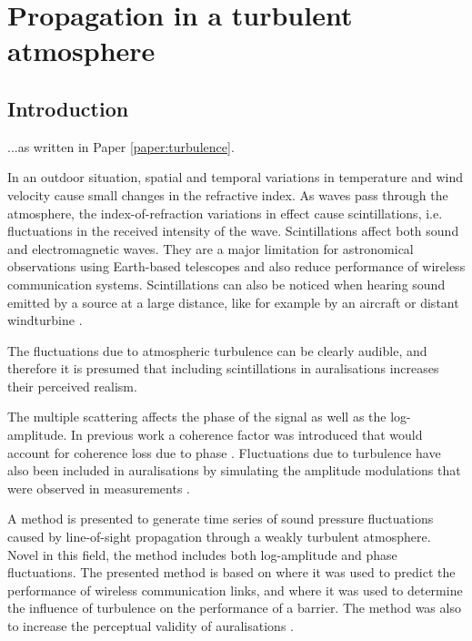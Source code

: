 \chapter{Propagation in a turbulent atmosphere}\label{chapter:turbulence}

\section{Introduction}

...as written in Paper \ref{paper:turbulence}.

In an outdoor situation, spatial and temporal variations in temperature and wind
velocity cause small changes in the refractive index. As waves pass through the
atmosphere, the index-of-refraction variations in effect cause scintillations,
i.e. fluctuations in the received intensity of the wave. Scintillations affect
both sound and electromagnetic waves. They are a major limitation for
astronomical observations using Earth-based telescopes and also reduce
performance of wireless communication systems. Scintillations can also be
noticed when hearing sound emitted by a source at a large distance, like for
example by an aircraft or distant windturbine \cite{Heutschi2014}.

The fluctuations due to atmospheric turbulence can be clearly audible, and
therefore it is presumed that including scintillations in auralisations
increases their perceived realism.

The multiple scattering affects the phase of the signal as well as the
log-amplitude. In previous work a coherence factor was introduced that would
account for coherence loss due to phase \cite{Shin2006, Arntzen2014b,
Arntzen2014a}. Fluctuations due to turbulence have also been included in
auralisations by simulating the amplitude modulations that were observed in
measurements \cite{Heutschi2014, Minard2016}.

A method is presented to generate time series of sound pressure
fluctuations caused by line-of-sight propagation through a weakly turbulent
atmosphere. Novel in this field, the method includes both log-amplitude and
phase fluctuations. The presented method is based on \cite{Jurado-navas2006}
where it was used to predict the performance of wireless communication links,
and \cite{Forssen2000} where it was used to determine the influence of
turbulence on the performance of a barrier. The method was also
to increase the perceptual validity of auralisations
\cite{Rietdijk2014,Rietdijk2014a}.

